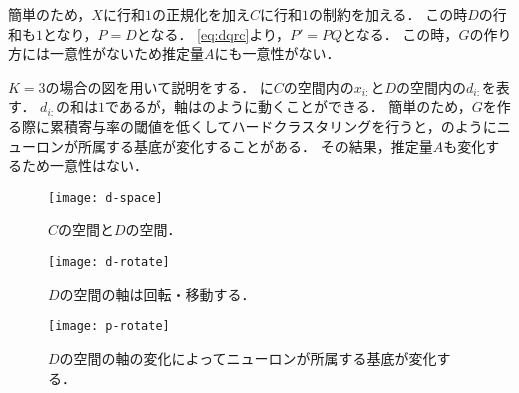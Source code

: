 簡単のため，$X$に行和$1$の正規化を加え$C$に行和$1$の制約を加える．
この時$D$の行和も$1$となり，$P = D$となる．
\eqref{eq:dqrc}より，$P' = PQ$となる．
この時，$G$の作り方には一意性がないため推定量$A$にも一意性がない．

$K=3$の場合の図を用いて説明をする．
に$C$の空間内の$x_{i:}$と$D$の空間内の$d_{i:}$を表す．
$d_{i:}$の和は$1$であるが，軸はのように動くことができる．
簡単のため，$G$を作る際に累積寄与率の閾値を低くしてハードクラスタリングを行うと，のようにニューロンが所属する基底が変化することがある．
その結果，推定量$A$も変化するため一意性はない．

\begin{figure}[htbp]
    \begin{minipage}{0.69\hsize}
			\begin{center}
					\texttt{[image: d-space]}
					\caption{$C$の空間と$D$の空間．}
					\label{fig:d-space}
			\end{center}
		\end{minipage}
    \begin{minipage}{0.3\hsize}
			\begin{center}
					\texttt{[image: d-rotate]}
					\caption{$D$の空間の軸は回転・移動する．}
					\label{fig:d-rotate}
			\end{center}
		\end{minipage}
\end{figure}
\begin{figure}[htbp]
		\begin{center}
				\texttt{[image: p-rotate]}
				\caption{$D$の空間の軸の変化によってニューロンが所属する基底が変化する．}
				\label{fig:p-rotate}
		\end{center}
\end{figure}

